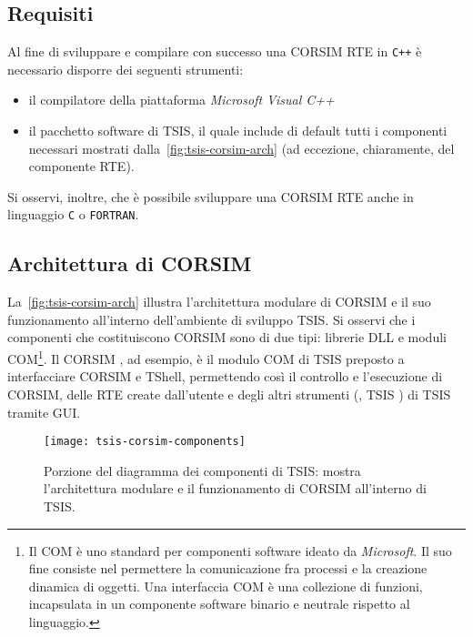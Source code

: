 \subsection{Requisiti}
Al fine di sviluppare e compilare con successo una \acs{CORSIM} \acs{RTE} in \lstinline[]|C++| è necessario disporre dei seguenti strumenti:
\begin{itemize}
    \item il compilatore della piattaforma \emph{Microsoft Visual C++}
    \item il pacchetto software di \acs{TSIS}, il quale include di default tutti i componenti necessari mostrati dalla~\vref{fig:tsis-corsim-arch} (ad eccezione, chiaramente, del componente \acs{RTE}).
\end{itemize}
Si osservi, inoltre, che è possibile sviluppare una \acs{CORSIM} \acs{RTE} anche in linguaggio \lstinline[]|C| o \lstinline[]|FORTRAN|.

\subsection{Architettura di CORSIM}

La~\vref{fig:tsis-corsim-arch} illustra l'architettura modulare di \acs{CORSIM} e il suo funzionamento all'interno dell'ambiente di sviluppo \acs{TSIS}. Si osservi che i componenti che costituiscono \acs{CORSIM} sono di due tipi: librerie \acs{DLL} e moduli \acs{COM}\footnote{Il \acf{COM} è uno standard per componenti software ideato da \emph{Microsoft}. Il suo fine consiste nel permettere la comunicazione fra processi e la creazione dinamica di oggetti. Una interfaccia \acs{COM} è una collezione di funzioni, incapsulata in un componente software binario e neutrale rispetto al linguaggio.}. Il \acs{CORSIM} , ad esempio, è il modulo \acs{COM} di \acs{TSIS} preposto a interfacciare \acs{CORSIM} e \acs{TShell}, permettendo così il controllo e l'esecuzione di \acs{CORSIM}, delle \acs{RTE} create dall'utente e degli altri strumenti (\eg{}, \acs{TSIS} ) di \acs{TSIS} tramite \acs{GUI}.

\begin{sidewaysfigure}
\centering
\texttt{[image: tsis-corsim-components]}
\caption[Diagramma dei componenti di \acs{CORSIM}]{Porzione del diagramma dei componenti di \acs{TSIS}: mostra l'architettura modulare e il funzionamento di \acs{CORSIM} all'interno di \acs{TSIS}.}
\label{fig:tsis-corsim-arch}
\end{sidewaysfigure}

